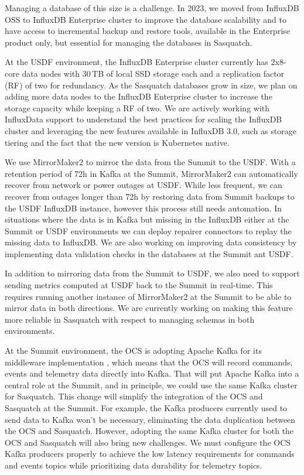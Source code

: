 Managing a database of this size is a challenge. In 2023, we moved from InfluxDB OSS to InfluxDB Enterprise cluster to improve the database scalability and to have access to incremental backup and restore tools, available in the Enterprise product only, but essential for managing the databases in Sasquatch.

At the USDF environment, the InfluxDB Enterprise cluster currently has 2x8-core data nodes with 30\,TB of local SSD storage each and a replication factor (RF) of two for redundancy. As the Sasquatch databases grow in size, we plan on adding more data nodes to the InfluxDB Enterprise cluster to increase the storage capacity while keeping a RF of two. We are actively working with InfluxData support to understand the best practices for scaling the InfluxDB cluster and leveraging the new features available in InfluxDB 3.0, such as storage tiering and the fact that the new version is Kubernetes native.

We use MirrorMaker2 to mirror the data from the Summit to the USDF. With a retention period of 72h in Kafka at the Summit, MirrorMaker2 can automatically recover from network or power outages at USDF. While less frequent, we can recover from outages longer than 72h by restoring data from Summit backups to the USDF InfluxDB instance, however this process still needs automation. In situations where the data is in Kafka but missing in the InfluxDB either at the Summit or USDF environments we can deploy repairer connectors to replay the missing data to InfluxDB. We are also working on improving data consistency by implementing data validation checks in the databases at the Summit ant USDF.

In addition to mirroring data from the Summit to USDF, we also need to support sending metrics computed at USDF back to the Summit in real-time. This requires running another instance of MirrorMaker2 at the Summit to be able to mirror data in both directions. We are currently working on making this feature more reliable in Sasquatch with respect to managing schemas in both environments.

At the Summit environment, the OCS is adopting Apache Kafka for its middleware implementation \cite{2024SPIE13101.59Ftmp, TSTN-033}, which means that the OCS will record commands, events and telemetry data directly into Kafka. That will put Apache Kafka into a central role at the Summit, and in principle, we could use the same Kafka cluster for Sasquatch. This change will simplify the integration of the OCS and Sasquatch at the Summit. For example, the Kafka producers currently used to send data to Kafka won't be necessary, eliminating the data duplication between the OCS and Sasquatch. However, adopting the same Kafka cluster for both the OCS and Sasquatch will also bring new challenges. We must configure the OCS Kafka producers properly to achieve the low latency requirements for commands and events topics while prioritizing data durability for telemetry topics.

